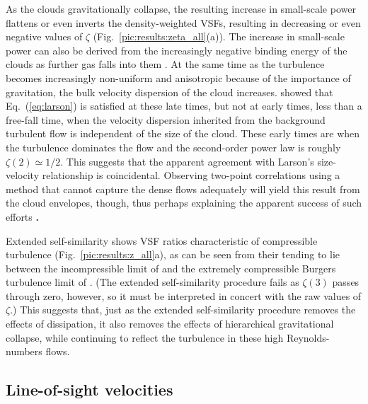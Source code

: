 As the clouds gravitationally collapse, the resulting increase in small-scale power flattens or even inverts the density-weighted VSFs, resulting in decreasing or even negative values of $\zeta$ (Fig.~\ref{pic:results:zeta_all}(a)). The increase in small-scale power can also be derived from the increasingly negative binding energy of the clouds as further gas falls into them . 
At the same time as the turbulence becomes increasingly non-uniform and anisotropic because of the importance of gravitation, the bulk velocity dispersion of the cloud increases.
 showed that Eq.~(\ref{eq:larson}) is satisfied at these late times, but not at early times, less than a free-fall time, when the velocity dispersion inherited from the background turbulent flow is independent of the size of the cloud. 
These early times are when the turbulence dominates the flow and the second-order power law is roughly $\zeta(2) \simeq 1/2$.
This suggests that the apparent agreement with Larson's size-velocity relationship is coincidental. Observing two-point correlations using a method that cannot capture the dense flows adequately will yield this result from the cloud envelopes, though, thus perhaps explaining the apparent success of such efforts \textbf{\citep[][Fig.\ 9 shows how these different interpretations can arise]{Goodman1998}.}

Extended self-similarity shows VSF ratios characteristic of compressible turbulence (Fig.~\ref{pic:results:z_all}a), as can be seen from their tending to lie between the incompressible limit of \citet{She1994} and the extremely compressible Burgers turbulence limit of \citet{Boldyrev2002}.
(The extended self-similarity procedure fails as $\zeta(3)$ passes through zero, however, so it must be interpreted in concert with the raw values of $\zeta$.)
This suggests that, just as the extended self-similarity procedure removes the effects of dissipation, it also removes the effects of hierarchical gravitational collapse, while continuing to reflect the turbulence in these high Reynolds-numbers flows.


\subsection{Line-of-sight velocities}\label{discussion:1d}

